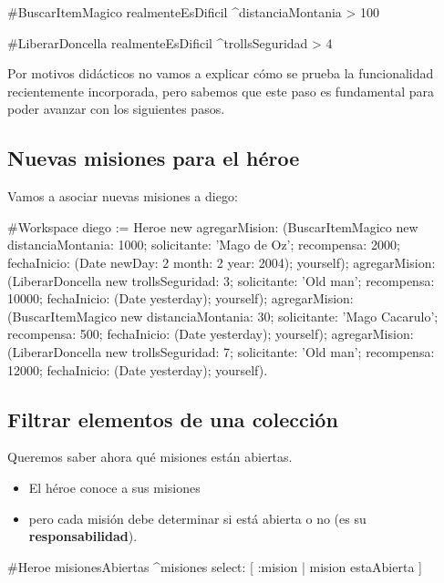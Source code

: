 \documentclass[a4paper,12pt]{book}
\begin{document}
\begin{code}
#BuscarItemMagico
realmenteEsDificil      
  ^distanciaMontania > 100

#LiberarDoncella
realmenteEsDificil      
  ^trollsSeguridad > 4
\end{code}

Por motivos didácticos no vamos a explicar cómo se prueba la funcionalidad recientemente incorporada, pero
sabemos que este paso es fundamental para poder avanzar con los siguientes pasos.

\subsection{Nuevas misiones para el héroe}
Vamos a asociar nuevas misiones a diego:

\begin{code}
#Workspace
diego := Heroe new
  agregarMision: (BuscarItemMagico new 
			distanciaMontania: 1000;
			solicitante: 'Mago de Oz';
			recompensa: 2000;
			fechaInicio: (Date newDay: 2 month: 2 year: 2004);
			yourself);
  agregarMision: (LiberarDoncella new 
			trollsSeguridad: 3;
			solicitante: 'Old man';
			recompensa: 10000;
			fechaInicio: (Date yesterday);
			yourself);
  agregarMision: (BuscarItemMagico new 
			distanciaMontania: 30;
			solicitante: 'Mago Cacarulo';
			recompensa: 500;
			fechaInicio: (Date yesterday);
			yourself);
  agregarMision: (LiberarDoncella new 
			trollsSeguridad: 7;
			solicitante: 'Old man';
			recompensa: 12000;
			fechaInicio: (Date yesterday);
			yourself).

\end{code}

\subsection{Filtrar elementos de una colección}

Queremos saber ahora qué misiones están abiertas.

\begin{itemize}
 \item El héroe conoce a sus misiones
 \item pero cada misión debe determinar si está abierta o no (es su \textbf{responsabilidad}). 
\end{itemize}

\begin{code}
#Heroe
misionesAbiertas
  ^misiones select: [ :mision | mision estaAbierta ] 
\end{code}
\end{document}
